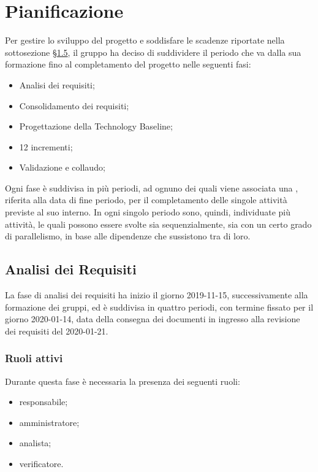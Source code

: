 \section{Pianificazione}

	Per gestire lo sviluppo del progetto e soddisfare le scadenze riportate nella sottosezione \hyperref[riferimento_scadenze]{\S1.5}, il gruppo ha deciso di suddividere il periodo che va dalla sua formazione fino al completamento del progetto nelle seguenti fasi:
	\begin{itemize}
		\item Analisi dei requisiti;
		\item Consolidamento dei requisiti;
		\item Progettazione della Technology Baseline;
		\item 12 incrementi;
		\item Validazione e collaudo;
	\end{itemize}
	Ogni fase è suddivisa in più periodi, ad ognuno dei quali viene associata una , riferita alla data di fine periodo, per il completamento delle singole attività previste al suo interno. In ogni singolo periodo sono, quindi, individuate più attività, le quali possono essere svolte sia sequenzialmente, sia con un certo grado di parallelismo, in base alle dipendenze che sussistono tra di loro.
	
	\subsection{Analisi dei Requisiti}
	
		La fase di analisi dei requisiti ha inizio il giorno 2019-11-15, successivamente alla formazione dei gruppi, ed è suddivisa in quattro periodi, con termine fissato per il giorno 2020-01-14, data della consegna dei documenti in ingresso alla revisione dei requisiti del 2020-01-21.
		
		\subsubsection{Ruoli attivi}
		
			Durante questa fase è necessaria la presenza dei seguenti ruoli:
			\begin{itemize}
				\item responsabile;
				\item amministratore;
				\item analista;
				\item verificatore.
			\end{itemize}
		
